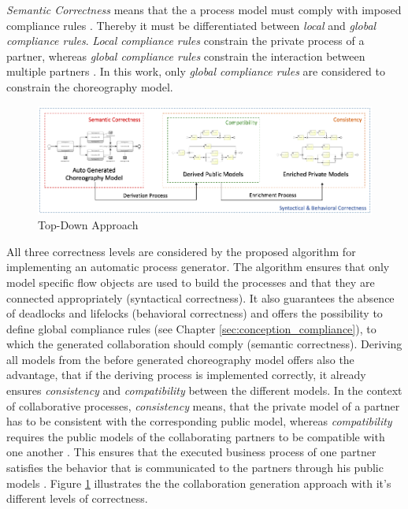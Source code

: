 \textit{Semantic Correctness} means that the a process model must comply with imposed compliance rules \cite{sabrina848}. Thereby it must be differentiated between \textit{local} and \textit{global compliance rules}. \textit{Local compliance rules} constrain the private process of a partner, whereas \textit{global compliance rules} constrain the interaction between multiple partners \cite{sabrina1174}. In this work, only \textit{global compliance rules} are considered to constrain the choreography model.

\begin{figure}[H]
\includegraphics[width=1\textwidth]{src/images/conception_approach.png}
\caption{Top-Down Approach}
\label{fig:topdownapproach}
\end{figure}

All three correctness levels are considered by the proposed algorithm for implementing an automatic process generator. The algorithm ensures that only model specific flow objects are used to build the processes and that they are connected appropriately (syntactical correctness). It also guarantees the absence of deadlocks and lifelocks (behavioral correctness) and offers the possibility to define global compliance rules (see Chapter \ref{sec:conception_compliance}), to which the generated collaboration should comply (semantic correctness). Deriving all models from the before generated choreography model offers also the advantage, that if the deriving process is implemented correctly, it already ensures \textit{consistency} and \textit{compatibility} between the different models. In the context of collaborative processes, \textit{consistency} means, that the private model of a partner has to be consistent with the corresponding public model, whereas \textit{compatibility} requires the public models of the collaborating partners to be compatible with one another \cite{FDHILA20151}. This ensures that the executed business process of one partner satisfies the behavior that is communicated to the partners through his public models \cite{sabrina1174}. Figure \ref{fig:topdownapproach} illustrates the the collaboration generation approach with it's different levels of correctness.\\

